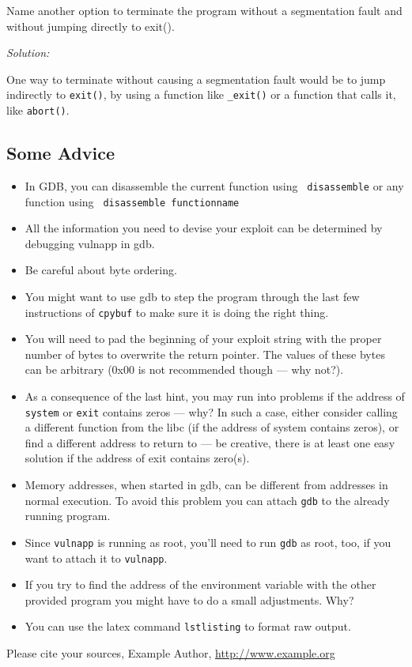 \documentclass[a4paper,11pt]{article}
\newenvironment{solution}%
{\par{\noindent\small\textit{Solution:}}\vspace{-12pt}\begin{framed}}%
{\end{framed}\par}
\begin{document}
\noindent
Name another option to terminate the program without a segmentation fault and
without jumping directly to exit().  
\ifsolution\begin{solution}
	One way to terminate without causing a segmentation fault would be to jump indirectly to \texttt{exit()}, by using a function like 
	\texttt{\_exit()} or a function that calls it, like \texttt{abort()}.
\end{solution}\fi



\subsection*{Some Advice}
\begin{itemize}
\item In GDB, you can disassemble the current function using {\tt
      disassemble} or any function using {\tt
      disassemble functionname}
\item All the information you need to devise your exploit can be
  determined by debugging {\sc vulnapp} in gdb.
\item
Be careful about byte ordering.
\item
You might want to use {\sc gdb} to step the program through the last few
instructions of {\tt cpybuf} to make sure it is doing the right thing.
\item
You will need to pad the beginning of your exploit string with the proper number of
bytes to overwrite the return pointer. The values of these bytes can
be arbitrary (0x00 is not recommended though --- why not?).
\item As a consequence of the last hint, you may run into problems if
  the address of {\tt system} or {\tt exit} contains zeros --- why? In
  such a case, either consider calling a different function from the
  libc (if the address of system contains zeros), or find a different
  address to return to --- be creative, there is at least one easy
  solution if the address of exit contains zero(s).
\item Memory addresses, when started in gdb, can be different from addresses in
normal execution.  To avoid this problem you can attach {\tt gdb} to the already running
program.
\item Since {\tt vulnapp} is running as root, you'll need to run {\tt gdb} as root, too, if you want to attach it to {\tt vulnapp}.

\item If you try to find the address of the environment variable with the other
provided program you might have to do a small adjustments. Why?

\item You can use the latex command \texttt{lstlisting} to  format raw output.

\end{itemize}



\begin{thebibliography}{---}
 Please cite your sources, Example Author, \url{http://www.example.org}
\end{thebibliography}
\end{document}
